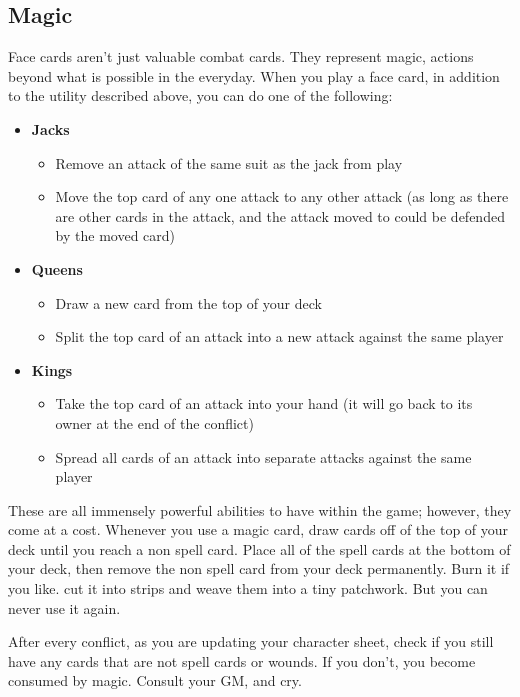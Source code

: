 \documentclass[]{article}
\begin{document}
{	\subsection*{Magic}
		Face cards aren't just valuable combat cards. They represent magic, actions beyond what is possible in the everyday. When you play a face card, in addition to the utility described above, you can do one of the following:
		\begin{itemize}
			\item \textbf{Jacks} \begin{itemize}
				\item Remove an attack of the same suit as the jack from play
				\item Move the top card of any one attack to any other attack (as long as there are other cards in the attack, and the attack moved to could be defended by the moved card)
			\end{itemize}
			\item \textbf{Queens} \begin{itemize}
				\item Draw a new card from the top of your deck
				\item Split the top card of an attack into a new attack against the same player
			\end{itemize}
			\item \textbf{Kings} \begin{itemize}
				\item Take the top card of an attack into your hand (it will go back to its owner at the end of the conflict)
				\item Spread all cards of an attack into separate attacks against the same player
			\end{itemize}
		\end{itemize}
		These are all immensely powerful abilities to have within the game; however, they come at a cost. Whenever you use a magic card, draw cards off of the top of your deck until you reach a non spell card. Place all of the spell cards at the bottom of your deck, then remove the non spell card from your deck permanently. Burn it if you like. cut it into strips and weave them into a tiny patchwork. But you can never use it again.
		
		After every conflict, as you are updating your character sheet, check if you still have any cards that are not spell cards or wounds. If you don't, you become consumed by magic. Consult your GM, and cry.
			
}
\end{document}
